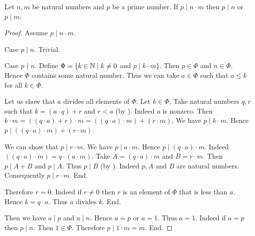 \documentclass[10pt]{article}
\begin{document}
  \begin{forthel}
    \begin{proposition}[id=ARITHMETIC_10_8313676557713408,printid]
      Let $n, m$ be natural numbers and $p$ be a prime number.
      If $p \mid n \cdot m$ then $p \mid n$ or $p \mid m$.
    \end{proposition}
    \begin{proof}
      Assume $p \mid n \cdot m$.

      Case $p \mid n$. Trivial.

      Case $p \nmid n$.
        Define $\Phi = \{ k \in \mathbb{N} \mid k \neq 0$ and $p \mid k \cdot m \}$.
        Then $p \in \Phi$ and $n \in \Phi$.
        Hence $\Phi$ contains some natural number.
        Thus we can take $a \in \Phi$ such that $a \leq k$ for all $k \in \Phi$.

        Let us show that $a$ divides all elements of $\Phi$.
          Let $k \in \Phi$.
          Take natural numbers $q, r$ such that $k = (a \cdot q) + r$ and $r < a$ (by ).
          Indeed $a$ is nonzero.
          Then $k \cdot m
            = ((q \cdot a) + r) \cdot m
            = ((q \cdot a) \cdot m) + (r \cdot m)$.
          We have $p \mid k \cdot m$.
          Hence $p \mid ((q \cdot a) \cdot m) + (r \cdot m)$.

          We can show that $p \mid r \cdot m$.
            We have $p \mid a \cdot m$.
            Hence $p \mid (q \cdot a) \cdot m$.
            Indeed $((q \cdot a) \cdot m) = q \cdot (a \cdot m)$. %
            Take $A = (q \cdot a) \cdot m$ and $B = r \cdot m$. %
            Then $p \mid A + B$ and $p \mid A$.
            Thus $p \mid B$ (by ).
            Indeed $p, A$ and $B$ are natural numbers.
            Consequently $p \mid r \cdot m$.
          End.

          Therefore $r = 0$.
          Indeed if $r \neq 0$ then $r$ is an element of $\Phi$ that is less than $a$.
          Hence $k = q \cdot a$.
          Thus $a$ divides $k$.
        End.

        Then we have $a \mid p$ and $a \mid n$.
        Hence $a = p$ or $a = 1$.
        Thus $a = 1$.
        Indeed if $a = p$ then $p \mid n$.
        Then $1 \in \Phi$.
        Therefore $p \mid 1 \cdot m = m$.
      End.
    \end{proof}
  \end{forthel}
\end{document}
